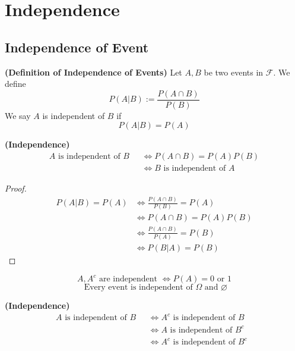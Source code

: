 \documentclass{report}
\begin{document}
\chapter{Independence}
\section{Independence of Event}
\begin{definition}
\label{3.1.1}
\textbf{(Definition of Independence of Events)} Let $A,B$ be two events in  $\mathcal{F}$. We define
\begin{equation*}
P\left(A|B \right):=\frac{P\left(A\cap B \right)}{P\left(B \right)}
\end{equation*}
We say $A$ is independent of $B$ if 
\begin{equation*}
P\left( A|B\right)=P\left(A \right)
\end{equation*}
\end{definition}
\begin{theorem}
\label{3.1.2}
\textbf{(Independence)}
\begin{align*}
  A\text{ is independent of $B$ }&\iff  P\left(A\cap B \right)=P\left(A \right)P\left(B \right)\\
  &\iff B\text{ is independent of $A$ }
\end{align*}
\end{theorem}
\begin{proof}
\begin{align*}
  P\left( A|B\right)=P\left(A \right)&\iff \frac{P\left(A\cap B \right)}{P\left(B \right)}=P\left(A \right)\\
  &\iff P\left(A\cap B \right)=P\left(A \right)P\left(B \right)\\
  &\iff \frac{P\left(A\cap B \right)}{P\left(A \right)}=P\left(B \right)\\
  &\iff P\left(B|A\right)=P\left(B \right)
\end{align*}
\end{proof}
\begin{corollary}
\label{3.1.3}
\begin{equation*}
A,A^c\text{ are independent }\iff P\left(A \right)=0\text{ or }1
\end{equation*}
\begin{equation*}
\text{ Every event is independent of  }\Omega\text{ and }\varnothing
\end{equation*}
\end{corollary}
\begin{corollary}
\label{3.1.4}
\textbf{(Independence)} 
\begin{align}
  A\text{ is independent of $B$ }&\iff  A^c\text{ is independent of $B$ }\\
  &\iff A\text{ is independent of }B^c\\
  &\iff A^c\text{ is independent of $B^c$ }
\end{align}
\end{corollary}
\end{document}
